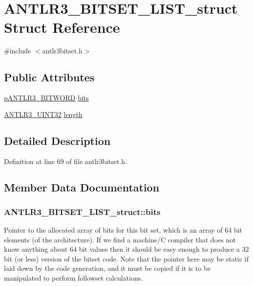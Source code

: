 \hypertarget{struct_a_n_t_l_r3___b_i_t_s_e_t___l_i_s_t__struct}{\section{A\-N\-T\-L\-R3\-\_\-\-B\-I\-T\-S\-E\-T\-\_\-\-L\-I\-S\-T\-\_\-struct Struct Reference}
\label{struct_a_n_t_l_r3___b_i_t_s_e_t___l_i_s_t__struct}
}


{\ttfamily \#include $<$antlr3bitset.\-h$>$}

\subsection*{Public Attributes}
\begin{DoxyCompactItemize}
\item 
\hyperlink{antlr3defs_8h_a50233e1bfa47b7aecd0ef4bf471d1a20}{p\-A\-N\-T\-L\-R3\-\_\-\-B\-I\-T\-W\-O\-R\-D} \hyperlink{struct_a_n_t_l_r3___b_i_t_s_e_t___l_i_s_t__struct_aacbf2010515e473d888167d89ffda12b}{bits}
\item 
\hyperlink{antlr3defs_8h_ac41f744abd0fd25144b9eb9d11b1dfd1}{A\-N\-T\-L\-R3\-\_\-\-U\-I\-N\-T32} \hyperlink{struct_a_n_t_l_r3___b_i_t_s_e_t___l_i_s_t__struct_a94f5be886e6aa4c19828209409ec6fa3}{length}
\end{DoxyCompactItemize}


\subsection{Detailed Description}


Definition at line 69 of file antlr3bitset.\-h.



\subsection{Member Data Documentation}
\hypertarget{struct_a_n_t_l_r3___b_i_t_s_e_t___l_i_s_t__struct_aacbf2010515e473d888167d89ffda12b}{
\subsubsection[{bits}]{ A\-N\-T\-L\-R3\-\_\-\-B\-I\-T\-S\-E\-T\-\_\-\-L\-I\-S\-T\-\_\-struct\-::bits}}\label{struct_a_n_t_l_r3___b_i_t_s_e_t___l_i_s_t__struct_aacbf2010515e473d888167d89ffda12b}
Pointer to the allocated array of bits for this bit set, which is an array of 64 bit elements (of the architecture). If we find a machine/\-C compiler that does not know anything about 64 bit values then it should be easy enough to produce a 32 bit (or less) version of the bitset code. Note that the pointer here may be static if laid down by the code generation, and it must be copied if it is to be manipulated to perform followset calculations. 

